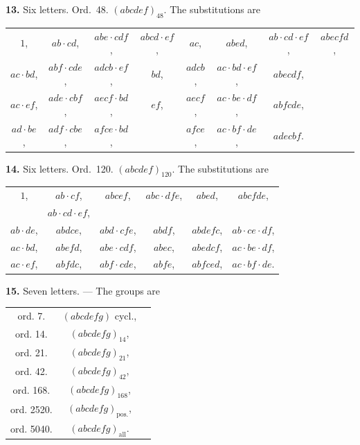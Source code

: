 \documentclass[11pt,a4paper]{article}
\begin{document}
\vspace{0.5em}
\textbf{13.} Six letters. Ord.~48. $(abcdef)_{48}$. The substitutions are
\begin{center}
\begin{tabular}{cccccccc}
$1$, & $ab \cdot cd$, & $abe \cdot cdf$, & $abcd \cdot ef$, & $ac$, & $abed$, & $ab \cdot cd \cdot ef$, & $abecfd$, \\
$ac \cdot bd$, & $abf \cdot cde$, & $adcb \cdot ef$, & $bd$, & $adcb$, & $ac \cdot bd \cdot ef$, & $abecdf$, \\
$ac \cdot ef$, & $ade \cdot cbf$, & $aecf \cdot bd$, & $ef$, & $aecf$, & $ac \cdot be \cdot df$, & $abfcde$, \\
$ad \cdot be$, & $adf \cdot cbe$, & $afce \cdot bd$, & & $afce$, & $ac \cdot bf \cdot de$, & $adecbf$.
\end{tabular}
\end{center}

\vspace{0.5em}
\textbf{14.} Six letters. Ord.~120. $(abcdef)_{120}$. The substitutions are
\begin{center}
\begin{tabular}{cccccc}
$1$, & $ab \cdot cf$, & $abcef$, & $abc \cdot dfe$, & $abed$, & $abcfde$, \\
& $ab \cdot cd \cdot ef$, \\
$ab \cdot de$, & $abdce$, & $abd \cdot cfe$, & $abdf$, & $abdefc$, & $ab \cdot ce \cdot df$, \\
$ac \cdot bd$, & $abefd$, & $abe \cdot cdf$, & $abec$, & $abedcf$, & $ac \cdot be \cdot df$, \\
$ac \cdot ef$, & $abfdc$, & $abf \cdot cde$, & $abfe$, & $abfced$, & $ac \cdot bf \cdot de$.
\end{tabular}
\end{center}

\vspace{0.5em}
\textbf{15.} Seven letters. --- The groups are
\begin{center}
\begin{tabular}{ccl}
ord.  7. & $(abcdefg)$ cycl., \\
ord. 14. & $(abcdefg)_{14}$, \\
ord. 21. & $(abcdefg)_{21}$, \\
ord. 42. & $(abcdefg)_{42}$, \\
ord. 168. & $(abcdefg)_{168}$, \\
ord. 2520. & $(abcdefg)_{\text{pos.}}$, \\
ord. 5040. & $(abcdefg)_{\text{all}}$.
\end{tabular}
\end{center}
\end{document}
